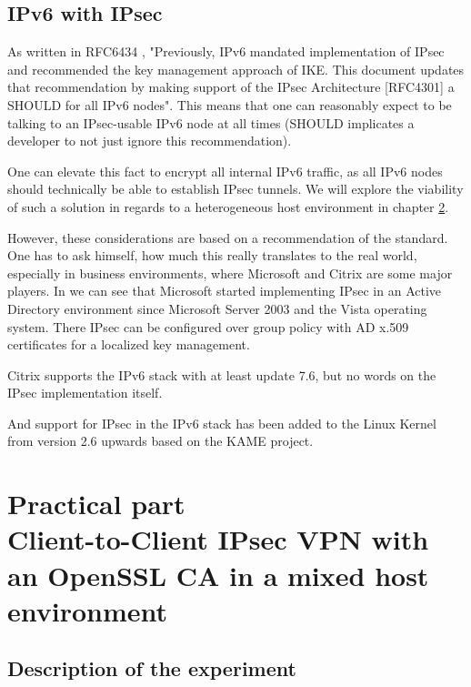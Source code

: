 \documentclass[a4paper]{report}
\begin{document}
\section{IPv6 with IPsec}
\label{sec:IPv6IPsec}

As written in RFC6434 \parencite{Jankiewicz2011}, "Previously, IPv6 mandated implementation of IPsec and recommended the key management approach of IKE. This document updates that recommendation by making support of the IPsec Architecture [RFC4301] a SHOULD for all IPv6 nodes". This means that one can reasonably expect to be talking to an IPsec-usable IPv6 node at all times (SHOULD implicates a developer to not just ignore this recommendation).

One can elevate this fact to encrypt all internal IPv6 traffic, as all IPv6 nodes should technically be able to establish IPsec tunnels. We will explore the viability of such a solution in regards to a heterogeneous host environment in chapter \ref{ch:Practical}.

However, these considerations are based on a recommendation of the standard. One has to ask himself, how much this really translates to the real world, especially in business environments, where Microsoft and Citrix are some major players.
In \cite{MicrosoftTechnet2003} we can see that Microsoft started implementing IPsec in an Active Directory environment since Microsoft Server 2003 and the Vista operating system. There IPsec can be configured over group policy with AD x.509 certificates for a localized key management.

Citrix supports the IPv6 stack with at least update 7.6, but no words on the IPsec implementation itself.

And support for IPsec in the IPv6 stack has been added to the Linux Kernel from version 2.6 upwards based on the KAME project.

\chapter[Practical part\\Client-to-Client IPsec VPN with an OpenSSL CA in a mixed host environment]{Practical part\\\large{Client-to-Client IPsec VPN with an OpenSSL CA in a mixed host environment}}
\label{ch:Practical}

\section{Description of the experiment}
\label{sec:ExpDesc}
\end{document}
